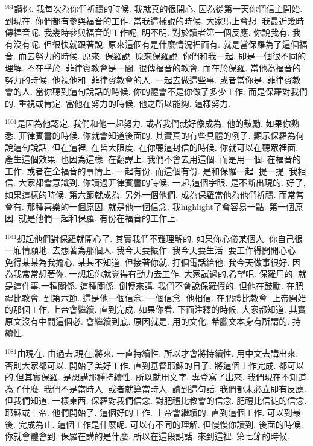 \documentclass{book}
\begin{document}
$^{961}$讚你.
我每次為你們祈禱的時候.
我就真的很開心.
因為從第一天你們信主開始.
到現在.
你們都有參與福音的工作.
當我這樣說的時候.
大家馬上會想.
我最近幾時傳福音呢.
我幾時參與福音的工作呢.
明不明.
對於讀者第一個反應.
你說我有.
我有沒有呢.
但很快就跟著說.
原來這個有是什麼情況裡面有.
就是當保羅為了這個福音.
而去努力的時候.
原來.
保羅說.
原來保羅說.
你們和我一起.
即是一個很不同的理解.
不在乎於.
菲律賓教會是一間.
很傳福音的教會.
而在於保羅.
當他為福音的努力的時候.
他視他和.
菲律賓教會的人.
一起去做這些事.
或者當你是.
菲律賓教會的人.
當你聽到這句說話的時候.
你的體會不是你做了多少工作.
而是保羅對我們的.
重視或肯定.
當他在努力的時候.
他之所以能夠.
這樣努力.

$^{1001}$是因為他認定.
我們和他一起努力.
或者我們就好像成為.
他的鼓勵.
如果你熟悉.
菲律賓書的時候.
你就會知道後面的.
其實真的有些具體的例子.
顯示保羅為何說這句說話.
但在這裡.
在哲大限度.
在你聽這封信的時候.
你就可以在聽眾裡面.
產生這個效果.
也因為這樣.
在翻譯上.
我們不會去用這個.
而是用一個.
在福音的工作.
或者在全福音的事情上.
一起有份.
而這個有份.
是和保羅一起.
提一提.
我相信.
大家都會意識到.
你讀過菲律賓書的時候.
一起,這個字眼.
是不斷出現的.
好了,如果這樣的時候.
第六節就成為.
另外一個他們.
成為保羅當他為他們祈禱.
而常常會有.
那種喜樂的一個原因.
就是他一個信念.
我highlight了會容易一點.
第一個原因.
就是他們一起和保羅.
有份在福音的工作上.

$^{1041}$想起他們對保羅就開心了.
其實我們不難理解的.
如果你心儀某個人.
你自己很一廂情願地.
去想著為那個人.
我今天要振作.
我今天要生活.
要工作得開開心心.
免得某某為我擔心.
某某不知道.
但接著你就.
打個電話給他.
我今天做事很好.
因為我常常想著你.
一想起你就覺得有動力去工作.
大家試過的,希望吧.
保羅用的.
就是這件事,一種關係.
這種關係.
倒轉來講.
我們不會說保羅假的.
但他在鼓勵.
在肥禮比教會.
到第六節.
這是他一個信念.
一個信念.
他相信.
在肥禮比教會.
上帝開始的那個工作.
上帝會繼續.
直到完成.
如果你看.
下面注釋的時候.
大家都知道.
其實原文沒有中間這個必.
會繼續到底.
原因就是.
用的文化.
希臘文本身有所謂的.
持續性.

$^{1081}$由現在.
由過去,現在,將來.
一直持續性.
所以才會將持續性.
用中文去講出來.
否則大家都可以.
開始了美好工作.
直到基督耶穌的日子.
將這個工作完成.
都可以的,但其實保羅.
是想講那種持續性.
所以就用文字.
專登寫了出來.
我們現在不知道.
為了什麼.
我們不是當時人.
或者就算當時人.
讀到這句話.
我們都未必立即有反應.
但我們知道.
一樣東西.
保羅對我們信念.
對肥禮比教會的信念.
肥禮比信徒的信念.
耶穌或上帝.
他們開始了.
這個好的工作.
上帝會繼續的.
直到這個工作.
可以到最後.
完成為止.
這個工作是什麼呢.
可以有不同的理解.
但慢慢你讀到.
後面的時候.
你就會體會到.
保羅在講的是什麼.
所以在這段說話.
來到這裡.
第七節的時候.
\end{document}
